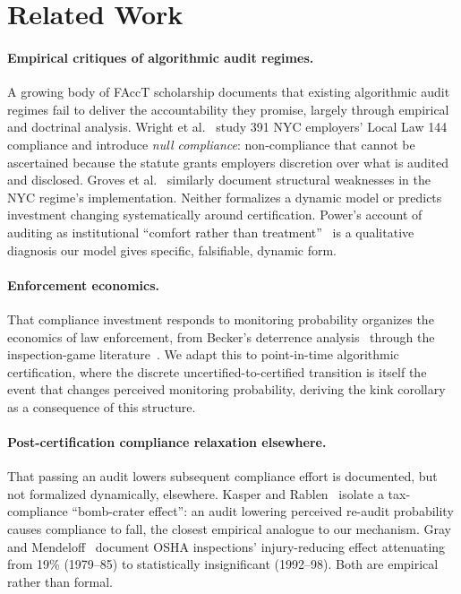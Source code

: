 \section{Related Work}
\label{sec:related}

\paragraph{Empirical critiques of algorithmic audit regimes.} A growing body of FAccT scholarship documents that existing algorithmic audit regimes fail to deliver the accountability they promise, largely through empirical and doctrinal analysis. Wright et al.~\cite{wright2024null} study 391 NYC employers' Local Law 144 compliance and introduce \emph{null compliance}: non-compliance that cannot be ascertained because the statute grants employers discretion over what is audited and disclosed. Groves et al.~\cite{groves2024auditing} similarly document structural weaknesses in the NYC regime's implementation. Neither formalizes a dynamic model or predicts investment changing systematically around certification. Power's account of auditing as institutional ``comfort rather than treatment''~\cite{power1997audit} is a qualitative diagnosis our model gives specific, falsifiable, dynamic form.

\paragraph{Enforcement economics.} That compliance investment responds to monitoring probability organizes the economics of law enforcement, from Becker's deterrence analysis~\cite{becker1968crime} through the inspection-game literature~\cite{mookherjee1992monitoring}. We adapt this to point-in-time algorithmic certification, where the discrete uncertified-to-certified transition is itself the event that changes perceived monitoring probability, deriving the kink corollary as a consequence of this structure.

\paragraph{Post-certification compliance relaxation elsewhere.} That passing an audit lowers subsequent compliance effort is documented, but not formalized dynamically, elsewhere. Kasper and Rablen~\cite{kasper2023tax} isolate a tax-compliance ``bomb-crater effect'': an audit lowering perceived re-audit probability causes compliance to fall, the closest empirical analogue to our mechanism. Gray and Mendeloff~\cite{gray2004declining} document OSHA inspections' injury-reducing effect attenuating from 19\% (1979--85) to statistically insignificant (1992--98). Both are empirical rather than formal.

